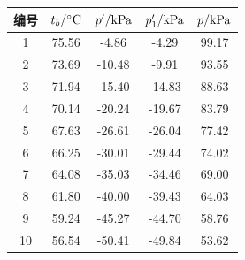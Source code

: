 \documentclass[12pt]{article}
\begin{document}
 \begin{table}[h]
	\centering
	\begin{tabular}{ccccc}
		\toprule
		编号 & $t_{b}/{\rm ^{\circ}C}$& $p^{\prime}/{\rm kPa}$ & $p_{1}^{\prime}/{\rm kPa}$ & $p/{\rm kPa}$  \\
		\midrule
		1  & 75.56 & -4.86  & -4.29  & 99.17 \\
		2  & 73.69 & -10.48 & -9.91  & 93.55 \\
		3  & 71.94 & -15.40 & -14.83 & 88.63 \\
		4  & 70.14 & -20.24 & -19.67 & 83.79 \\
		5  & 67.63 & -26.61 & -26.04 & 77.42 \\
		6  & 66.25 & -30.01 & -29.44 & 74.02 \\
		7  & 64.08 & -35.03 & -34.46 & 69.00 \\
		8  & 61.80 & -40.00 & -39.43 & 64.03 \\
		9  & 59.24 & -45.27 & -44.70 & 58.76 \\
		10 & 56.54 & -50.41 & -49.84 & 53.62 \\
		\bottomrule
	\end{tabular}
\end{table}
\par

 
\end{document}

